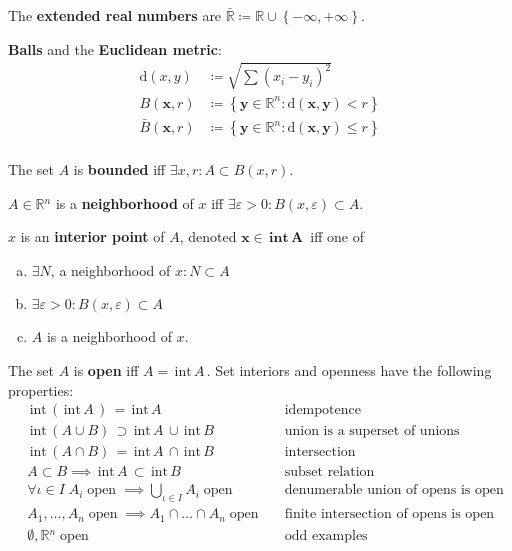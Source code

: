 \documentclass[letterpaper,11pt]{amsart}
\newcommand{\dist}[2]{\textrm{d}\left( {#1}, {#2} \right)}
\newcommand{\ballo}[2]{B\left( {#1}, {#2} \right)}
\newcommand{\ballc}[2]{\bar{B}\left( {#1}, {#2} \right)}
\newcommand{\interior}[1]{\,\textrm{int}\,{#1}\,}
\newcommand{\reals}{\mathbb{R}}
\newcommand{\keyphrase}[1]{\textbf{#1}}
\DeclareMathOperator{\open}{open}
\begin{document}
The \keyphrase{extended real numbers} are
$\bar{\reals{}}\coloneqq\reals{}\cup{}\left\{-\infty,+\infty \right\}$.

\keyphrase{Balls} and the \keyphrase{Euclidean metric}:
\begin{align*}
    \dist{x}{y}
    &\coloneqq \sqrt{\sum \left( x_{i} - y_{i} \right)^{2}} \\
    \ballo{\mathbf{x}}{r} &\coloneqq
    \left\{\mathbf{y}\in\reals^{n}:\dist{\mathbf{x}}{\mathbf{y}}<r\right\} \\
    \ballc{\mathbf{x}}{r} &\coloneqq
    \left\{\mathbf{y}\in\reals^{n}:\dist{\mathbf{x}}{\mathbf{y}}\leq{}r\right\} \\
\end{align*}

The set $A$ is \keyphrase{bounded} iff $\exists x,r : A\subset{}\ballo{x}{r}$.

$A\in{}\reals{}^{n}$ is a \keyphrase{neighborhood} of $x$ iff
$\exists \varepsilon > 0: \ballo{x}{\varepsilon}\subset{}A$.

$x$ is an \keyphrase{interior point} of $A$, denoted 
$\boldsymbol{x\in\interior{A}}$ iff one of
\begin{enumerate}[(a)]
    \item $\exists N$, a neighborhood of $x : N\subset{}A$
    \item $\exists \varepsilon > 0: \ballo{x}{\varepsilon}\subset{}A$
    \item $A$ is a neighborhood of $x$.
\end{enumerate}

The set $A$ is \keyphrase{open} iff $A = \interior{A}$.
Set interiors and openness have the following properties:
\begin{align*}
    &\interior{\left(\interior{A}\right)} = \interior{A}
    & &\text{idempotence} \\
    &\interior{\left( A \cup B \right)}\supset \interior{A} \cup \interior{B}
    & &\text{union is a superset of unions} \\
    &\interior{\left( A \cap B \right)} = \interior{A} \cap \interior{B}
    & &\text{intersection} \\
    &A\subset{}B \implies \interior{A}\subset \interior{B}
    & &\text{subset relation} \\
    &\forall \iota \in I \; 
        A_{i} \open \implies \bigcup\limits_{\iota\in{}I} A_{i} \open
    & &\text{denumerable union of opens is open} \\
    &A_{1}, \dots, A_{n} \open \implies A_{1}\cap{}\dots\cap{}A_{n} \open
    & &\text{finite intersection of opens is open} \\
    &\emptyset, \reals{}^{n} \open
    & &\text{odd examples} 
\end{align*}
\end{document}

